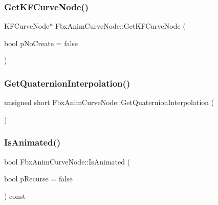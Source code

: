 \subsubsection{\texorpdfstring{Get\+K\+F\+Curve\+Node()}{GetKFCurveNode()}}
{\footnotesize\ttfamily K\+F\+Curve\+Node$\ast$ Fbx\+Anim\+Curve\+Node\+::\+Get\+K\+F\+Curve\+Node (\begin{DoxyParamCaption}\item[{bool}]{p\+No\+Create = {\ttfamily false} }\end{DoxyParamCaption})}

\mbox{\label{class_fbx_anim_curve_node_aef47daaf7f219b58537fcd4e40adee38}} 
\subsubsection{\texorpdfstring{Get\+Quaternion\+Interpolation()}{GetQuaternionInterpolation()}}
{\footnotesize\ttfamily unsigned short Fbx\+Anim\+Curve\+Node\+::\+Get\+Quaternion\+Interpolation (\begin{DoxyParamCaption}{ }\end{DoxyParamCaption})}

\mbox{\label{class_fbx_anim_curve_node_ad9ca0ff8cf30e3b55c91184be5f693ac}} 
\subsubsection{\texorpdfstring{Is\+Animated()}{IsAnimated()}}
{\footnotesize\ttfamily bool Fbx\+Anim\+Curve\+Node\+::\+Is\+Animated (\begin{DoxyParamCaption}\item[{bool}]{p\+Recurse = {\ttfamily false} }\end{DoxyParamCaption}) const}

